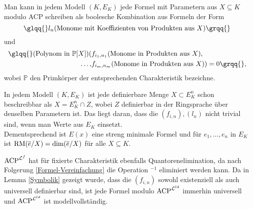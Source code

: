     \begin{corollary}\label{Formel-Vereinfachung}
    	Man kann in jedem Modell $(K,E_K)$ jede Formel mit Parametern aus $X\subseteq K$ modulo ACP schreiben als boolesche Kombination aus Formeln der Form $$\glqq{}l_n(\text{Monome mit Koeffizienten von Produkten aus }X)\grqq{}$$ und
    	\begin{align*}
    	\text{\glqq{}}(\text{Polynom in }\mathbb{P}[X])(&f_{i_1,n_1}(\text{Monome in Produkten aus }X),\\\dots,&f_{i_m,n_m}(\text{Monome in Produkten aus }X))=0\grqq{},
    	\end{align*}
        wobei $\mathbb{P}$ den Primkörper der entsprechenden Charakteristik bezeichne.
    \end{corollary}
    \begin{corollary}
    	In jedem Modell $(K,E_K)$ ist jede definierbare Menge $X\subset E_K^n$ schon beschreibbar als $X=E_K^n\cap Z$, wobei $Z$ definierbar in der Ringsprache über denselben Parametern ist. Das liegt daran, dass die $(f_{i,n}),(l_n)$ nicht trivial sind, wenn man Werte aus $E_K$ einsetzt.\\ Dementsprechend ist $E(x)$ eine streng minimale Formel und für $e_1,\dots,e_n$ in $E_K$ ist $\operatorname{RM}(\overline{e}/X)=\dim(\overline{e}/X)$ für alle $X\subseteq K$.
    \end{corollary}
    \begin{corollary}
    	$\operatorname{ACP}^{\mathcal{L}^f}$ hat für fixierte Charakteristik ebenfalls Quantorenelimination, da nach Folgerung \ref{Formel-Vereinfachung} die Operation \glqq{}$^{-1}$\grqq{} eliminiert werden kann. Da in Lemma \ref{Symbolik} gezeigt wurde, dass die $(f_{i,n})$ sowohl existenziell als auch universell definierbar sind, ist jede Formel modulo $\operatorname{ACP}^{\mathcal{L}^{ld}}$ immerhin universell und $\operatorname{ACP}^{\mathcal{L}^{ld}}$ ist modellvollständig.
    \end{corollary}
    
